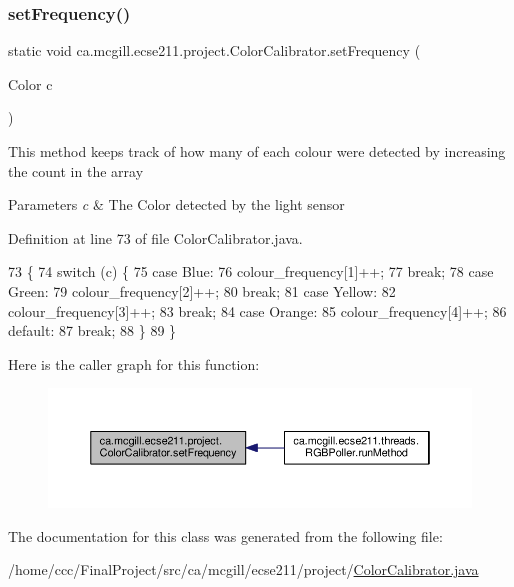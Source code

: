 \subsubsection{\texorpdfstring{set\+Frequency()}{setFrequency()}}
{\footnotesize\ttfamily static void ca.\+mcgill.\+ecse211.\+project.\+Color\+Calibrator.\+set\+Frequency (\begin{DoxyParamCaption}\item[{Color}]{c }\end{DoxyParamCaption})\hspace{0.3cm}{\ttfamily [static]}}

This method keeps track of how many of each colour were detected by increasing the count in the array


\begin{DoxyParams}{Parameters}
{\em c} & The Color detected by the light sensor \\
\hline
\end{DoxyParams}


Definition at line 73 of file Color\+Calibrator.\+java.


\begin{DoxyCode}
73                                            \{
74     \textcolor{keywordflow}{switch} (c) \{
75       \textcolor{keywordflow}{case} Blue:
76         colour\_frequency[1]++;
77         \textcolor{keywordflow}{break};
78       \textcolor{keywordflow}{case} Green:
79         colour\_frequency[2]++;
80         \textcolor{keywordflow}{break};
81       \textcolor{keywordflow}{case} Yellow:
82         colour\_frequency[3]++;
83         \textcolor{keywordflow}{break};
84       \textcolor{keywordflow}{case} Orange:
85         colour\_frequency[4]++;
86       \textcolor{keywordflow}{default}:
87         \textcolor{keywordflow}{break};
88     \}
89   \}
\end{DoxyCode}
Here is the caller graph for this function\+:\nopagebreak
\begin{figure}[H]
\begin{center}
\leavevmode
\includegraphics[width=350pt]{classca_1_1mcgill_1_1ecse211_1_1project_1_1_color_calibrator_a40906193773ead0bfd582f188413c97a_icgraph}
\end{center}
\end{figure}


The documentation for this class was generated from the following file\+:\begin{DoxyCompactItemize}
\item 
/home/ccc/\+Final\+Project/src/ca/mcgill/ecse211/project/\hyperlink{_color_calibrator_8java}{Color\+Calibrator.\+java}\end{DoxyCompactItemize}
